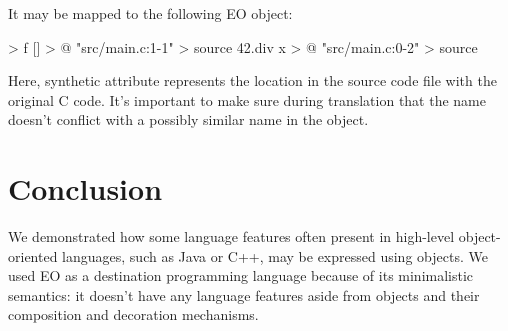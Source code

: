 \documentclass[sigplan,11pt,nonacm,natbib=false]{acmart}
\begin{document}
It may be mapped to the following EO object:

\begin{ffcode}
[x] > f
  [] > @
    "src/main.c:1-1" > source
    42.div x > @
  "src/main.c:0-2" > source
\end{ffcode}

Here, synthetic  attribute represents the location in the source code file with the original C code. It's important to make sure during translation that the name  doesn't conflict with a possibly similar name in the object.

\section{Conclusion}

We demonstrated how some language features often present in high-level object-oriented languages, such as Java or C++, may be expressed using objects. We used EO as a destination programming language because of its minimalistic semantics: it doesn't have any language features aside from objects and their composition and decoration mechanisms.

\printbibliography

\clearpage
\end{document}
